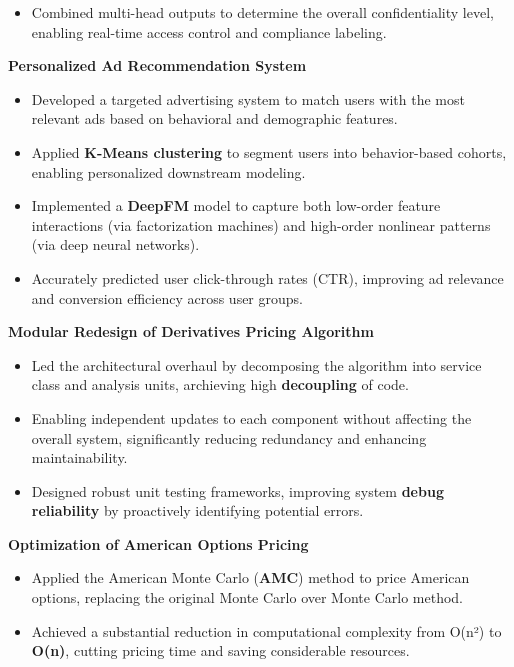 \begin{cventries}
{\begin{cvitems}
\begin{itemize}
          \item Combined multi-head outputs to determine the overall confidentiality level, enabling real-time access control and compliance labeling.
        \end{itemize}
        \item \textbf{Personalized Ad Recommendation System}
        \begin{itemize}
          \item Developed a targeted advertising system to match users with the most relevant ads based on behavioral and demographic features.
          \item Applied \textbf{K-Means clustering} to segment users into behavior-based cohorts, enabling personalized downstream modeling.
          \item Implemented a \textbf{DeepFM} model to capture both low-order feature interactions (via factorization machines) and high-order nonlinear patterns (via deep neural networks).
          \item Accurately predicted user click-through rates (CTR), improving ad relevance and conversion efficiency across user groups.
        \end{itemize}
        \item \textbf{Modular Redesign of Derivatives Pricing Algorithm}
        \begin{itemize}
          \item Led the architectural overhaul by decomposing the algorithm into service class and analysis units, archieving high \textbf{decoupling} of code.
          \item Enabling independent updates to each component without affecting the overall system, significantly reducing redundancy and enhancing maintainability.
          \item Designed robust unit testing frameworks, improving system \textbf{debug reliability} by proactively identifying potential errors.
        \end{itemize}
        \item \textbf{Optimization of American Options Pricing}
        \begin{itemize}
          \item Applied the American Monte Carlo (\textbf{AMC}) method to price American options, replacing the original Monte Carlo over Monte Carlo method. 
          \item Achieved a substantial reduction in computational complexity from O(n²) to \textbf{O(n)}, cutting pricing time and saving considerable resources.

\end{itemize}
\end{cvitems}}
\end{cventries}
